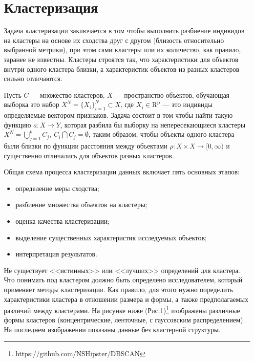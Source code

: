 \documentclass[article, 10pt]{disser}
\begin{document}
\section{Кластеризация}

Задача кластеризации заключается в том чтобы выполнить разбиение индивидов на кластеры на основе их сходства друг с другом (близость относительно выбранной метрики), при этом сами кластеры или их количество, как правило, заранее не известны. Кластеры строятся так, что характеристики для объектов внутри одного кластера близки, а характеристик объектов из разных кластеров сильно отличаются. 

Пусть $C$ --- множество кластеров, $X$ --- пространство объектов, обучающая выборка это набор $X^{N}  = \{X_{i}\}_{i = 1}^{N} \subset X$, где $X_{i} \in \mathrm{R^{p}}$ --- это индивиды определяемые вектором признаков. Задача состоит в том чтобы найти такую функцию $a: X \rightarrow Y$, которая разбила бы выборку на непересекающиеся кластеры $X^{N} = \bigcup_{j = 1}^{k} C_{j}, \  C_{i} \bigcap C_{j} = \emptyset$, таким образом, чтобы объекты одного кластера были близки по функции расстояния между объектами $\rho : X \times X \rightarrow [0,\infty)$ и существенно отличались для объектов разных кластеров.

Общая схема процесса кластеризации данных включает пять основных этапов: 

\begin{itemize}

\item определение меры сходства;

\item разбиение множества объектов на кластеры;

\item оценка качества кластеризации;

\item выделение существенных характеристик исследуемых объектов;

\item интерпретация результатов.

\end{itemize}

Не существует <<истинных>> или <<лучших>> определений для кластера. Что понимать под кластером должно быть определено исследователем, который применяет методы кластеризации. Как правило, для этого нужно определить характеристики кластера в отношении размера и формы, а также предполагаемых различий между кластерами. На рисунке ниже (Рис.1)\footnote{https://github.com/NSHipster/DBSCAN} изображены различные формы кластеров (концентрические, ленточные, с гауссовским распределением). На последнем изображении показаны данные без кластерной структуры.
\end{document}
